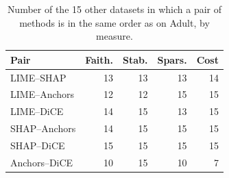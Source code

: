 \begin{table}[t]
\centering
\caption{Number of the 15 other datasets in which a pair of methods is in the same order as on Adult, by measure.}
\label{tab:adult}
\small
\begin{tabular}{@{}lrrrr@{}}
\toprule
Pair & Faith. & Stab. & Spars. & Cost \\
\midrule
LIME--SHAP & 13 & 13 & 13 & 14 \\
LIME--Anchors & 12 & 12 & 15 & 15 \\
LIME--DiCE & 14 & 15 & 13 & 15 \\
SHAP--Anchors & 14 & 15 & 15 & 15 \\
SHAP--DiCE & 15 & 15 & 15 & 15 \\
Anchors--DiCE & 10 & 15 & 10 & 7 \\
\bottomrule
\end{tabular}
\end{table}
